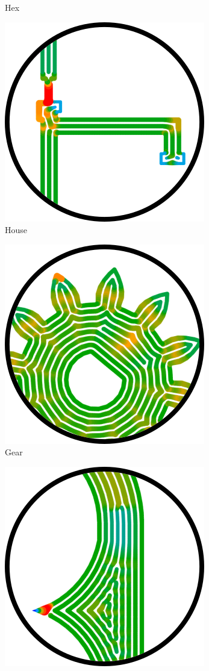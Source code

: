 \begin{figure}
\begin{subfigure}{\figwidth}
\caption{Hex}%
\end{subfigure}
\begin{subfigure}{\figwidth}\centering
\includegraphics[height=\figheight]{sources/applications/house.png}
\caption{House}%
\end{subfigure}
\begin{subfigure}{\figwidth}\centering
\includegraphics[height=\figheight]{sources/applications/pinion_gear_motor.png}
\caption{Gear}%
\end{subfigure}
\begin{subfigure}{\figwidth}\centering
\includegraphics[height=\figheight]{sources/applications/pocket_operator_case.png}

\end{subfigure}
\end{figure}
